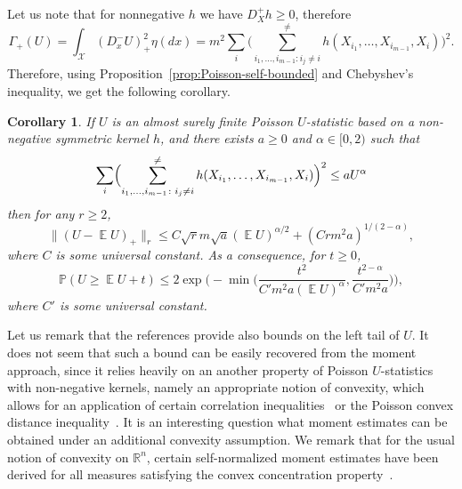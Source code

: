 \documentclass[a4paper]{amsart}
\newtheorem{corollary}[theorem]{Corollary} %
\theoremstyle{definition}
\theoremstyle{remark}
\numberwithin{equation}{section}
\newcommand*{\RR}{\mathbb{R}}
\DeclareMathOperator{\EE}{\mathbb{E}} %
\newcommand*{\PP}{\mathbb{P}} %
\begin{document}
 Let us note that for nonnegative $h$ we have $D_X^+ h \ge 0$, therefore
 \begin{displaymath}
   \Gamma_+(U) = \int_\mathcal{X} (D_x^- U)_+^2\eta(dx) = m^2 \sum_{i} \Big(\sum_{i_1,\ldots,i_{m-1}\colon i_j\neq i}^{\neq} h(X_{i_1},\ldots,X_{i_{m-1}},X_i)\Big)^2.
 \end{displaymath}
  Therefore, using Proposition~\ref{prop:Poisson-self-bounded} and Chebyshev's inequality, we get the following corollary.

  \begin{corollary}\label{cor:U-stat}
  If $U$ is an almost surely finite Poisson $U$-statistic based on a non-negative symmetric kernel $h$, and there exists $a\ge 0$ and $\alpha \in [0,2)$ such that
  \begin{align}\label{eq:U-stat-assumption}
    \sum_{i} \Bigl(\sum_{i_1,\ldots,i_{m-1}\colon i_j\neq i}^{\neq} h(X_{i_1},\ldots,X_{i_{m-1}},X_i) \Bigr)^2 \le a U^{\alpha}
  \end{align}
  then  for any $r \ge 2$,
  \begin{displaymath}
    \|(U - \EE U)_+\|_r \le C\sqrt{r}m\sqrt{a} (\EE U)^{\alpha/2} + (C r m^2a)^{1/(2-\alpha)},
  \end{displaymath}
  where $C$ is some universal constant. As a consequence, for $t \ge 0$,
  \begin{displaymath}
    \PP(U \ge \EE U + t) \le 2\exp\Big(-\min\Big(\frac{t^2}{C' m^2 a (\EE U)^\alpha}, \frac{t^{2-\alpha}}{C' m^2 a}\Big)\Big),
  \end{displaymath}
  where $C'$ is some universal constant.
  \end{corollary}

  Let us remark that the references \cite{MR3485348,MR3849811,gozlan2020transport} provide also bounds on the left tail of $U$. It does not seem that such a bound can be easily recovered from the moment approach, since it relies heavily on an another property of Poisson $U$-statistics with non-negative kernels, namely an appropriate notion of convexity, which allows for an application of certain correlation inequalities~\cite{MR3485348} or the Poisson convex distance inequality~\cite{MR3849811,gozlan2020transport}. It is an interesting question what moment estimates can be obtained under an additional convexity assumption. We remark that for the usual notion of convexity on $\RR^n$, certain self-normalized moment estimates have been derived for all measures satisfying the convex concentration property~\cite{MR3892322}.
\end{document}

